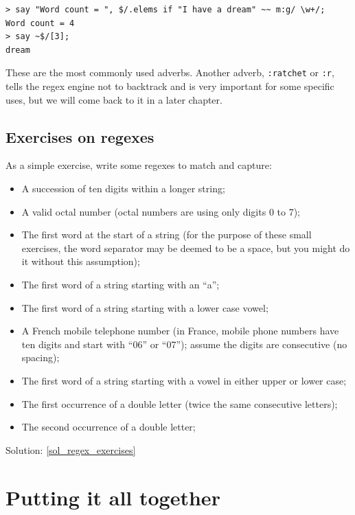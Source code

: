 \begin{verbatim}
> say "Word count = ", $/.elems if "I have a dream" ~~ m:g/ \w+/;
Word count = 4
> say ~$/[3];
dream
\end{verbatim}
%

These are the most commonly used adverbs. Another adverb, 
\verb':ratchet' or \verb':r', tells the regex engine 
not to backtrack and is very important for some specific 
uses, but we will come back to it in a later chapter.

\subsection{Exercises on regexes}
\label{regex_exercises}

As a simple exercise, write some regexes to match and capture:

\begin{itemize}
\item A succession of ten digits within a longer string;
\item A valid octal number (octal numbers are using only 
digits 0 to 7);
\item The first word at the start of a string (for the 
purpose of these small exercises, the word 
separator may be deemed to be a space, but you might do 
it without this assumption);
\item The first word of a string starting with an ``a'';
\item The first word of a string starting with a lower case vowel;
\item A French mobile telephone number (in France, mobile 
phone numbers have ten digits and start with ``06'' or ``07''); 
assume the digits are consecutive (no spacing);
\item The first word of a string starting with a vowel in 
either upper or lower case;
\item The first occurrence of a double letter (twice the
same consecutive letters);
\item The second occurrence of a double letter;
 
\end{itemize}

Solution: \ref{sol_regex_exercises}
 

\section{Putting it all together}


